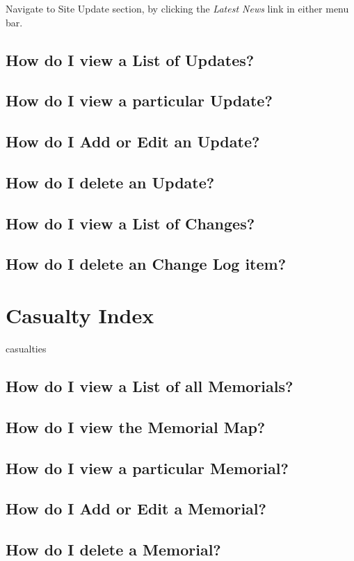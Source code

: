\documentclass[12pt]{article}
\begin{document}
Navigate to Site Update section, by clicking the \textit{Latest News} link in either menu bar.

\subsection{How do I view a List of Updates?}
\subsection{How do I view a particular Update?}
\subsection{How do I Add or Edit an Update?}
\subsection{How do I delete an Update?}
\subsection{How do I view a List of Changes?}
\subsection{How do I delete an Change Log item?}

\section{Casualty Index}\label{sec:casualtyIndex}
casualties
\subsection{How do I view a List of all Memorials?}
\subsection{How do I view the Memorial Map?}
\subsection{How do I view a particular Memorial?}
\subsection{How do I Add or Edit a Memorial?}
\subsection{How do I delete a Memorial?}
\end{document}
